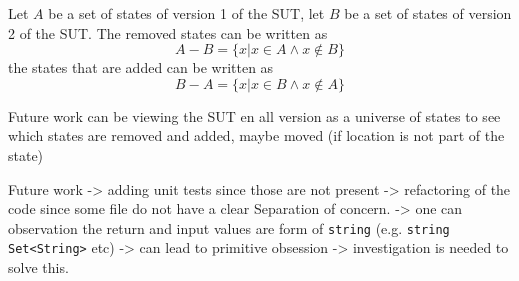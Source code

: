         Let $A$ be a set of states of version 1 of the SUT, let $B$ be a set of states of version 2 of the SUT. The removed states can be written as
        \[A-B = \lbrace x | x \in A \wedge x \notin B \rbrace\]
        the states that are added can be written as
        \[B-A = \lbrace x | x \in B \wedge x \notin A \rbrace\]
        
        Future work can be viewing the SUT en all version as a universe of states to see which states are removed and added, maybe moved (if location is not part of the state)
        
        Future work -> adding unit tests since those are not present -> refactoring of the code since some file do not have a clear Separation of concern. -> one can observation the return and input values are form of \verb|string| (e.g. \verb|string| \verb|Set<String>| etc) -> can lead to primitive obsession -> investigation is needed to solve this. 
